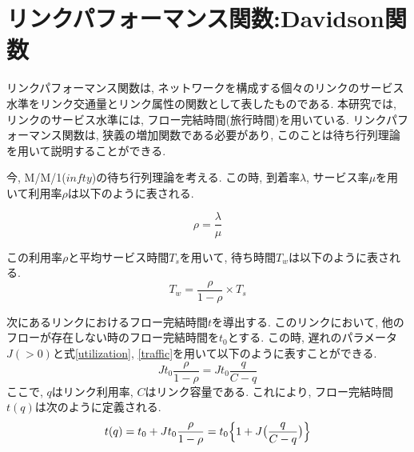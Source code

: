 \documentclass[a4paper,11pt,oneside,openany,uplatex]{jsbook}
\begin{document}
\section{リンクパフォーマンス関数:Davidson関数}
リンクパフォーマンス関数は, ネットワークを構成する個々のリンクのサービス水準をリンク交通量とリンク属性の関数として表したものである. 
本研究では, リンクのサービス水準には, フロー完結時間(旅行時間)を用いている. 
リンクパフォーマンス関数は, 狭義の増加関数である必要があり, このことは待ち行列理論を用いて説明することができる. 

今, M/M/1($infty$)の待ち行列理論を考える. 
この時, 到着率$\lambda$, サービス率$\mu$を用いて利用率$\rho$は以下のように表される. 

\begin{equation}
\label{utilization}
\rho = \frac{\lambda}{\mu}
\end{equation}

この利用率$\rho$と平均サービス時間$T_s$を用いて, 待ち時間$T_w$は以下のように表される. 
\begin{equation}
\label{traffic}
T_w = \frac{\rho}{1-\rho} \times T_s
\end{equation}

次にあるリンクにおけるフロー完結時間$t$を導出する. 
このリンクにおいて, 他のフローが存在しない時のフロー完結時間を$t_0$とする. 
この時, 遅れのパラメータ$J(>0)$と式\ref{utilization}, \ref{traffic}を用いて以下のように表すことができる. 
\begin{equation}
\label{delay}
J t_0 \frac{\rho}{1-\rho} = J t_0 \frac{q}{C-q} 
\end{equation}
ここで, $q$はリンク利用率, $C$はリンク容量である.
これにより, フロー完結時間$t(q)$は次のように定義される. 
\begin{eqnarray}
t(q) = t_{0} + J t_{0} \frac{\rho}{1-\rho} = t_{0}\Bigl\{ 1 + J \bigl(
\frac{q}{C-q} \bigr) \Bigr\}
\end{eqnarray}
\end{document}
